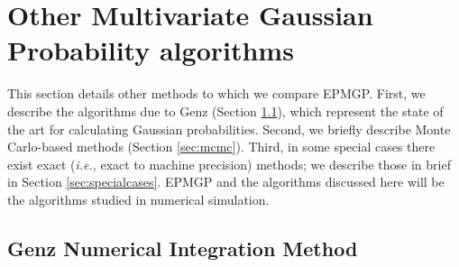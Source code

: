 \documentclass[twoside,11pt]{article}
\begin{document}




\section{Other Multivariate Gaussian Probability algorithms}
\label{sec:othermgp}

This section details other methods to which we compare EPMGP.  First, we describe the algorithms due to Genz (Section \ref{sec:Genz}), which represent the state of the art for calculating Gaussian probabilities.  Second, we briefly describe Monte Carlo-based methods (Section \ref{sec:mcmc}).  Third, in some special cases there exist exact ({\it i.e.}, exact to machine precision) methods; we describe those in brief in Section \ref{sec:specialcases}.  EPMGP and the algorithms discussed here will be the algorithms studied in numerical simulation.

\subsection{Genz Numerical Integration Method}
\label{sec:Genz}
\end{document}
